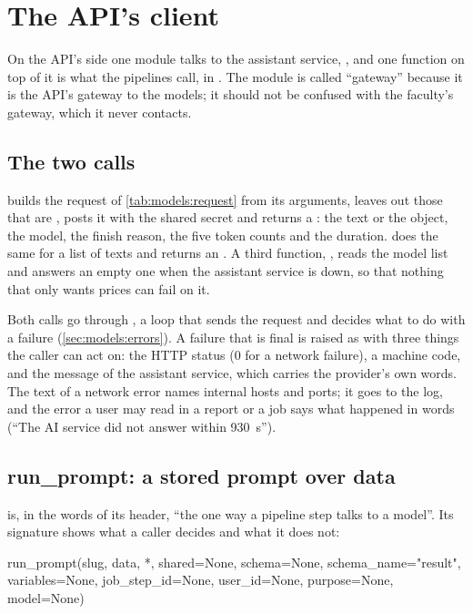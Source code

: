 \section{The API's client}\label{sec:models:client}

On the API's side one module talks to the assistant service, , and
one function on top of it is what the pipelines call,  in
. The module is called \enquote{gateway} because it is the API's
gateway to the models; it should not be confused with the faculty's gateway, which it never
contacts.

\subsection{The two calls}

 builds the request of \cref{tab:models:request} from its arguments,
leaves out those that are , posts it with the shared secret and returns a
: the text or the object, the model, the finish reason, the five token
counts and the duration.  does the same for a list of texts and returns an
. A third function, , reads the model list and answers an
empty one when the assistant service is down, so that nothing that only wants prices can fail
on it.

Both calls go through , a loop that sends the request and decides what to do
with a failure (\cref{sec:models:errors}). A failure that is final is raised as
 with three things the caller can act on: the HTTP status (0 for a network
failure), a machine code, and the message of the assistant service, which carries the
provider's own words. The text of a network error names internal hosts and ports; it goes to
the log, and the error a user may read in a report or a job says what happened in words
(\enquote{The AI service did not answer within 930~s}).

\subsection{run\_prompt: a stored prompt over data}

 is, in the words of its header, \enquote{the one way a pipeline step talks
to a model}. Its signature shows what a caller decides and what it does not:

\begin{codeblock}
run_prompt(slug, data, *, shared=None, schema=None, schema_name="result",
           variables=None, job_step_id=None, user_id=None, purpose=None, model=None)
\end{codeblock}

